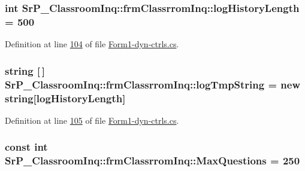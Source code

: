 \hypertarget{class_sr_p___classroom_inq_1_1frm_classrrom_inq_a0b55eb955abb243808249457ac92ca93}{
\subsubsection[{log\-History\-Length}]{\setlength{\rightskip}{0pt plus 5cm}int {\bf \-Sr\-P\-\_\-\-Classroom\-Inq\-::frm\-Classrrom\-Inq\-::log\-History\-Length} = 500}}
\label{class_sr_p___classroom_inq_1_1frm_classrrom_inq_a0b55eb955abb243808249457ac92ca93}


\-Definition at line \hyperlink{_form1-dyn-ctrls_8cs_source_l00104}{104} of file \hyperlink{_form1-dyn-ctrls_8cs_source}{\-Form1-\/dyn-\/ctrls.\-cs}.

\hypertarget{class_sr_p___classroom_inq_1_1frm_classrrom_inq_acf11c4997f1ad160ca28e4d7b1489f08}{
\subsubsection[{log\-Tmp\-String}]{\setlength{\rightskip}{0pt plus 5cm}string \mbox{[}$\,$\mbox{]} {\bf \-Sr\-P\-\_\-\-Classroom\-Inq\-::frm\-Classrrom\-Inq\-::log\-Tmp\-String} = new string\mbox{[}{\bf log\-History\-Length}\mbox{]}}}
\label{class_sr_p___classroom_inq_1_1frm_classrrom_inq_acf11c4997f1ad160ca28e4d7b1489f08}


\-Definition at line \hyperlink{_form1-dyn-ctrls_8cs_source_l00105}{105} of file \hyperlink{_form1-dyn-ctrls_8cs_source}{\-Form1-\/dyn-\/ctrls.\-cs}.

\hypertarget{class_sr_p___classroom_inq_1_1frm_classrrom_inq_abbcb6a4a2ba214bc7aab16386f0e8c98}{
\subsubsection[{\-Max\-Questions}]{\setlength{\rightskip}{0pt plus 5cm}const int {\bf \-Sr\-P\-\_\-\-Classroom\-Inq\-::frm\-Classrrom\-Inq\-::\-Max\-Questions} = 250}}
\label{class_sr_p___classroom_inq_1_1frm_classrrom_inq_abbcb6a4a2ba214bc7aab16386f0e8c98}


